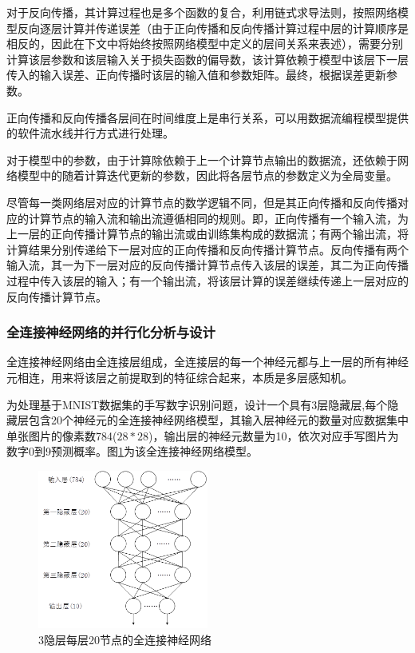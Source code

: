 对于反向传播，其计算过程也是多个函数的复合，利用链式求导法则，按照网络模型反向逐层计算并传递误差（由于正向传播和反向传播计算过程中层的计算顺序是相反的，因此在下文中将始终按照网络模型中定义的层间关系来表述），需要分别计算该层参数和该层输入关于损失函数的偏导数，该计算依赖于模型中该层下一层传入的输入误差、正向传播时该层的输入值和参数矩阵。最终，根据误差更新参数。

正向传播和反向传播各层间在时间维度上是串行关系，可以用数据流编程模型提供的软件流水线并行方式进行处理。

对于模型中的参数，由于计算除依赖于上一个计算节点输出的数据流，还依赖于网络模型中的随着计算迭代更新的参数，因此将各层节点的参数定义为全局变量。

尽管每一类网络层对应的计算节点的数学逻辑不同，但是其正向传播和反向传播对应的计算节点的输入流和输出流遵循相同的规则。即，正向传播有一个输入流，为上一层的正向传播计算节点的输出流或由训练集构成的数据流；有两个输出流，将计算结果分别传递给下一层对应的正向传播和反向传播计算节点。反向传播有两个输入流，其一为下一层对应的反向传播计算节点传入该层的误差，其二为正向传播过程中传入该层的输入；有一个输出流，将该层计算的误差继续传递上一层对应的反向传播计算节点。

\subsubsection{全连接神经网络的并行化分析与设计}
全连接神经网络由全连接层组成，全连接层的每一个神经元都与上一层的所有神经元相连，用来将该层之前提取到的特征综合起来，本质是多层感知机。

为处理基于MNIST数据集的手写数字识别问题，设计一个具有3层隐藏层,每个隐藏层包含20个神经元的全连接神经网络模型，其输入层神经元的数量对应数据集中单张图片的像素数784($28\ast28$)，输出层的神经元数量为10，依次对应手写图片为数字0到9预测概率。图\ref{fig:dnn}为该全连接神经网络模型。

\begin{figure}[!t]
\centering
\includegraphics[width=0.5\textwidth]{../img/Chap_Application/Yu/dnn.png}
\caption{3隐层每层20节点的全连接神经网络}
\label{fig:dnn}
\end{figure}

